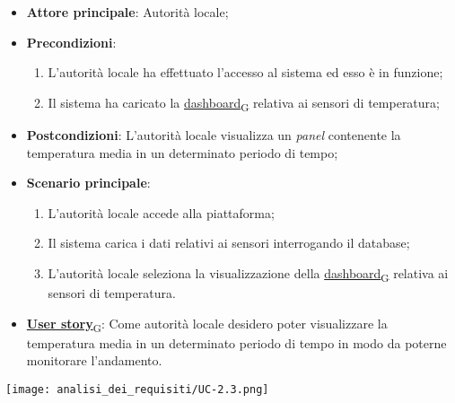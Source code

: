 \begin{itemize}
	\item \textbf{Attore principale}: Autorità locale;
	\item \textbf{Precondizioni}:
	      \begin{enumerate}
		      \item L'autorità locale ha effettuato l'accesso al sistema ed esso è in funzione;
		      \item Il sistema ha caricato la \href{https://7last.github.io/docs/rtb/documentazione-interna/glossario\#dashboard}{dashboard\textsubscript{G}} relativa ai sensori di temperatura;
	      \end{enumerate}
	\item \textbf{Postcondizioni}: L'autorità locale visualizza un \textit{panel} contenente la temperatura media in un determinato periodo di tempo;
	\item \textbf{Scenario principale}:
	      \begin{enumerate}
		      \item L'autorità locale accede alla piattaforma;
		      \item Il sistema carica i dati relativi ai sensori interrogando il database;
		      \item L'autorità locale seleziona la visualizzazione della \href{https://7last.github.io/docs/rtb/documentazione-interna/glossario\#dashboard}{dashboard\textsubscript{G}} relativa ai sensori di temperatura.
	      \end{enumerate}
	\item \href{https://7last.github.io/docs/rtb/documentazione-interna/glossario\#user-story}{\textbf{User story}\textsubscript{G}}: Come autorità locale desidero poter visualizzare la temperatura media in un determinato periodo di tempo
	      in modo da poterne monitorare l'andamento.
\end{itemize}
\begin{center}
	\texttt{[image: analisi\_dei\_requisiti/UC-2.3.png]}
\end{center}

